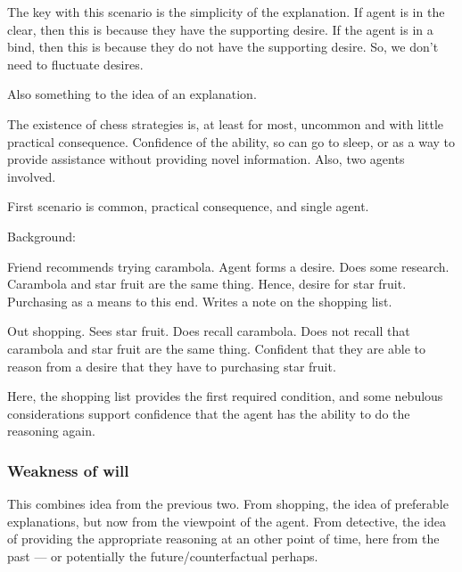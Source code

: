 \documentclass[10pt]{article}
\begin{document}
\begin{note}
  The key with this scenario is the simplicity of the explanation.
  If agent is in the clear, then this is because they have the supporting desire.
  If the agent is in a bind, then this is because they do not have the supporting desire.
  So, we don't need to fluctuate desires.

  Also something to the idea of an explanation.
\end{note}

The existence of chess strategies is, at least for most, uncommon and with little practical consequence.
Confidence of the ability, so can go to sleep, or as a way to provide assistance without providing novel information.
Also, two agents involved.

First scenario is common, practical consequence, and single agent.


\begin{scenario}[Shopping]

  Background:

  Friend recommends trying carambola.
  Agent forms a desire.
  Does some research.
  Carambola and star fruit are the same thing.
  Hence, desire for star fruit.
  Purchasing as a means to this end.
  Writes a note on the shopping list.

  Out shopping.
  Sees star fruit.
  Does recall carambola.
  Does not recall that carambola and star fruit are the same thing.
  Confident that they are able to reason from a desire that they have to purchasing star fruit.
\end{scenario}

\begin{note}
  Here, the shopping list provides the first required condition, and some nebulous considerations support confidence that the agent has the ability to do the reasoning again.
\end{note}




\subsubsection{Weakness of will}
\label{sec:weakness-will}

\begin{note}[Idea]
  This combines idea from the previous two.
  From shopping, the idea of preferable explanations, but now from the viewpoint of the agent.
  From detective, the idea of providing the appropriate reasoning at an other point of time, here from the past --- or potentially the future/counterfactual perhaps.
\end{note}
\end{document}
